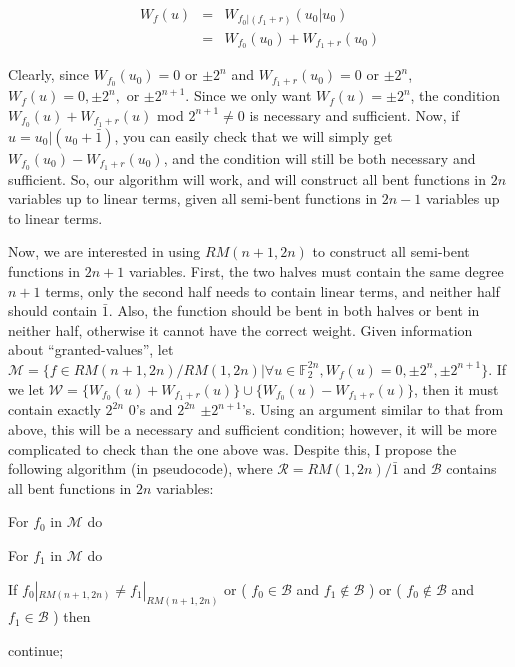 \documentclass[12pt]{amsart}
\newcommand{\F}{\mathbb{F}}
\newcommand{\tab}{\hspace*{2em}}
\begin{document}
\[
\begin{array}{rcl}
W_f(u) & = & W_{f_0|\left(f_1+r\right)}\left(u_0|u_0\right) \\
 & = & W_{f_0}(u_0) + W_{f_1+r}(u_0)
\end{array}
\]

\bigskip

Clearly, since $W_{f_0}(u_0) = 0$ or $\pm 2^n$ and $W_{f_1+r}(u_0) = 0$ or $\pm 2^n$, $W_f(u) = 0,\pm 2^n,$ or $\pm 2^{n+1}$.  Since we only want $W_f(u) = \pm 2^n$, the condition $W_{f_0}(u) + W_{f_1+r}(u)$ mod $2^{n+1} \neq 0$ is necessary and sufficient.  Now, if $u = u_0|(u_0+\bar{1})$, you can easily check that we will simply get $W_{f_0}(u_0) - W_{f_1+r}(u_0)$, and the condition will still be both necessary and sufficient.  So, our algorithm will work, and will construct all bent functions in $2n$ variables up to linear terms, given all semi-bent functions in $2n-1$ variables up to linear terms.

\newpage

Now, we are interested in using $RM(n+1,2n)$ to construct all semi-bent functions in $2n+1$ variables.  First, the two halves must contain the same degree $n+1$ terms, only the second half needs to contain linear terms, and neither half should contain $\bar{1}$.  Also, the function should be bent in both halves or bent in neither half, otherwise it cannot have the correct weight.  Given information about ``granted-values'', let $\mathcal{M} = \{f \in RM(n+1,2n)/RM(1,2n)|\forall u \in \F_2^{2n},W_f(u) = 0, \pm 2^n, \pm 2^{n+1}\}$.  If we let $\mathcal{W} = \{W_{f_0}(u)+W_{f_1+r}(u)\} \cup \{W_{f_0}(u)-W_{f_1+r}(u)\}$, then it must contain exactly $2^{2n}$ $0$'s and $2^{2n}$ $\pm 2^{n+1}$'s.  Using an argument similar to that from above, this will be a necessary and sufficient condition; however, it will be more complicated to check than the one above was.  Despite this, I propose the following algorithm (in pseudocode), where $\mathcal{R} = RM(1,2n)/\bar{1}$ and $\mathcal{B}$ contains all bent functions in $2n$ variables:

\bigskip

For $f_0$ in $\mathcal{M}$ do

\tab For $f_1$ in $\mathcal{M}$ do

\tab \tab If $f_0|_{RM(n+1,2n)} \neq f_1|_{RM(n+1,2n)}$ or ( $f_0 \in \mathcal{B}$ and $f_1 \not\in \mathcal{B}$ ) or ( $f_0 \not\in \mathcal{B}$ and $f_1 \in \mathcal{B}$ ) then

\tab \tab \tab continue;
\end{document}

